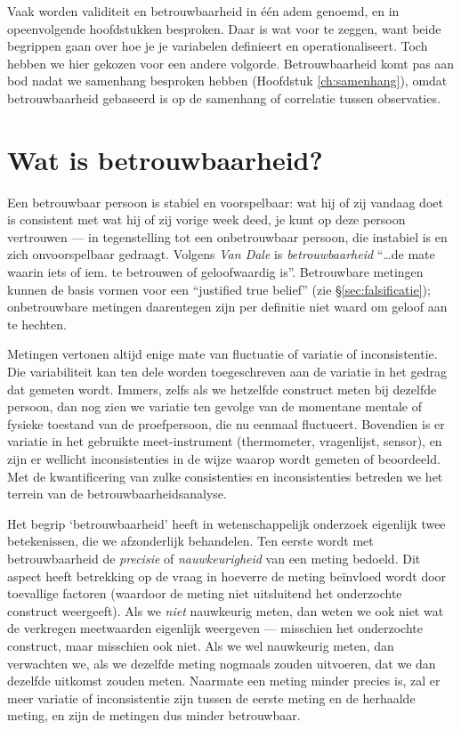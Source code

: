 \documentclass[
]{book}
\begin{document}
Vaak worden validiteit en betrouwbaarheid in één adem genoemd, en in opeenvolgende hoofdstukken besproken. Daar is wat voor te zeggen, want beide begrippen gaan over hoe je je variabelen definieert en operationaliseert. Toch hebben we hier gekozen voor een andere volgorde. Betrouwbaarheid komt pas aan bod nadat we samenhang besproken hebben (Hoofdstuk \ref{ch:samenhang}), omdat betrouwbaarheid gebaseerd is op de samenhang of correlatie tussen observaties.

\hypertarget{wat-is-betrouwbaarheid}{%
\section{Wat is betrouwbaarheid?}\label{wat-is-betrouwbaarheid}}

Een betrouwbaar persoon is stabiel en voorspelbaar: wat hij of zij
vandaag doet is consistent met wat hij of zij vorige week deed, je kunt
op deze persoon vertrouwen --- in tegenstelling tot een onbetrouwbaar
persoon, die instabiel is en zich onvoorspelbaar gedraagt. Volgens \emph{Van
Dale} is \emph{betrouwbaarheid} ``\ldots de mate waarin iets of iem. te betrouwen
of geloofwaardig is''. Betrouwbare metingen kunnen de basis vormen voor
een ``justified true belief'' (zie
§\ref{sec:falsificatie}); onbetrouwbare metingen daarentegen zijn
per definitie niet waard om geloof aan te hechten.

Metingen vertonen altijd enige mate van fluctuatie of variatie of
inconsistentie. Die variabiliteit kan ten dele worden toegeschreven aan
de variatie in het gedrag dat gemeten wordt. Immers, zelfs als we
hetzelfde construct meten bij dezelfde persoon, dan nog zien we variatie
ten gevolge van de momentane mentale of fysieke toestand van de
proefpersoon, die nu eenmaal fluctueert. Bovendien is er variatie in het
gebruikte meet-instrument (thermometer, vragenlijst, sensor), en zijn er
wellicht inconsistenties in de wijze waarop wordt gemeten of beoordeeld.
Met de kwantificering van zulke consistenties en inconsistenties
betreden we het terrein van de betrouwbaarheidsanalyse.

Het begrip `betrouwbaarheid' heeft in wetenschappelijk onderzoek
eigenlijk twee betekenissen, die we afzonderlijk behandelen. Ten eerste
wordt met betrouwbaarheid de \emph{precisie} of \emph{nauwkeurigheid} van een
meting bedoeld. Dit aspect heeft betrekking op de vraag in hoeverre de
meting beïnvloed wordt door toevallige factoren (waardoor de meting niet
uitsluitend het onderzochte construct weergeeft). Als we \emph{niet}
nauwkeurig meten, dan weten we ook niet wat de verkregen meetwaarden
eigenlijk weergeven --- misschien het onderzochte construct, maar
misschien ook niet. Als we wel nauwkeurig meten, dan verwachten we, als
we dezelfde meting nogmaals zouden uitvoeren, dat we dan dezelfde
uitkomst zouden meten. Naarmate een meting minder precies is, zal er
meer variatie of inconsistentie zijn tussen de eerste meting en de
herhaalde meting, en zijn de metingen dus minder betrouwbaar.
\end{document}
